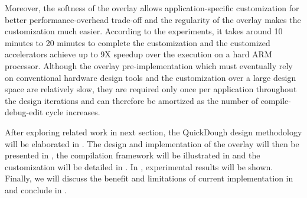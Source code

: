 Moreover, the softness of the overlay allows application-specific customization for better
performance-overhead trade-off and the regularity of the overlay makes the customization much
easier. According to the experiments, it takes around 10 minutes to 20 minutes to complete the
customization and the customized accelerators achieve up to 9X speedup over the execution on a hard
ARM processor. Although the overlay pre-implementation which must eventually rely
on conventional hardware design tools and the customization over a large design space are
relatively slow, they are required only once per application throughout the design iterations and
can therefore be amortized as the number of compile-debug-edit cycle increases.

After exploring related work in next section, the QuickDough design methodology will be elaborated
in . The design and implementation of the overlay will then be presented in
, the compilation framework will be illustrated in
 and the customization will be detailed in . In
, experimental results will be shown.
Finally, we will discuss the benefit and limitations of current implementation in
 and conclude in .
